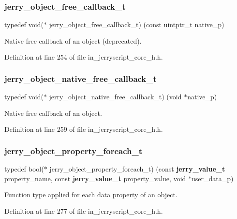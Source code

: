 \subsubsection{jerry\_object\_free\_callback\_t}
{\footnotesize\ttfamily typedef void($\ast$ jerry\+\_\+object\+\_\+free\+\_\+callback\+\_\+t) (const uintptr\+\_\+t native\+\_\+p)}

Native free callback of an object (deprecated). 

Definition at line 254 of file in\+\_\+jerryscript\+\_\+core\+\_\+h.\+h.

\mbox{\label{group___core_ga3abb8b1796ce7709484c92e9885eae9d}} 
\subsubsection{jerry\_object\_native\_free\_callback\_t}
{\footnotesize\ttfamily typedef void($\ast$ jerry\+\_\+object\+\_\+native\+\_\+free\+\_\+callback\+\_\+t) (void $\ast$native\+\_\+p)}

Native free callback of an object. 

Definition at line 259 of file in\+\_\+jerryscript\+\_\+core\+\_\+h.\+h.

\mbox{\label{group___core_gab0fadaaa6fdc658c469154cf88c9d12c}} 
\subsubsection{jerry\_object\_property\_foreach\_t}
{\footnotesize\ttfamily typedef bool($\ast$ jerry\+\_\+object\+\_\+property\+\_\+foreach\+\_\+t) (const \textbf{ jerry\+\_\+value\+\_\+t} property\+\_\+name, const \textbf{ jerry\+\_\+value\+\_\+t} property\+\_\+value, void $\ast$user\+\_\+data\+\_\+p)}

Function type applied for each data property of an object. 

Definition at line 277 of file in\+\_\+jerryscript\+\_\+core\+\_\+h.\+h.

\mbox{\label{group___core_ga6d09967b89b83f78f676970a48036f2d}} 
